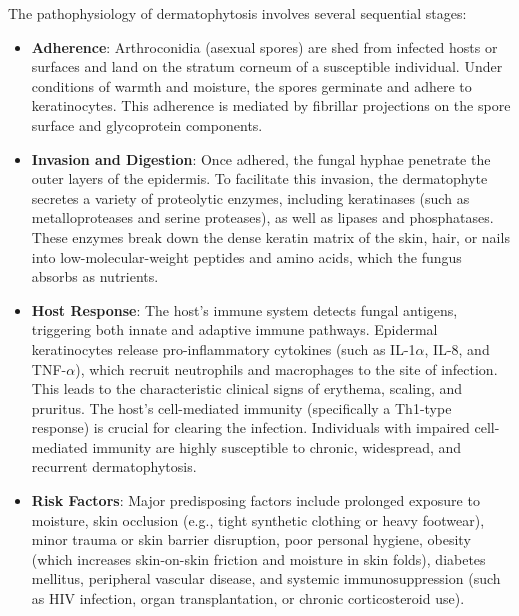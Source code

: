 The pathophysiology of dermatophytosis involves several sequential stages:
\begin{itemize}
    \item \textbf{Adherence}: Arthroconidia (asexual spores) are shed from infected hosts or surfaces and land on the stratum corneum of a susceptible individual. Under conditions of warmth and moisture, the spores germinate and adhere to keratinocytes. This adherence is mediated by fibrillar projections on the spore surface and glycoprotein components.
    \item \textbf{Invasion and Digestion}: Once adhered, the fungal hyphae penetrate the outer layers of the epidermis. To facilitate this invasion, the dermatophyte secretes a variety of proteolytic enzymes, including keratinases (such as metalloproteases and serine proteases), as well as lipases and phosphatases. These enzymes break down the dense keratin matrix of the skin, hair, or nails into low-molecular-weight peptides and amino acids, which the fungus absorbs as nutrients.
    \item \textbf{Host Response}: The host's immune system detects fungal antigens, triggering both innate and adaptive immune pathways. Epidermal keratinocytes release pro-inflammatory cytokines (such as IL-1$\alpha$, IL-8, and TNF-$\alpha$), which recruit neutrophils and macrophages to the site of infection. This leads to the characteristic clinical signs of erythema, scaling, and pruritus. The host's cell-mediated immunity (specifically a Th1-type response) is crucial for clearing the infection. Individuals with impaired cell-mediated immunity are highly susceptible to chronic, widespread, and recurrent dermatophytosis.
    \item \textbf{Risk Factors}: Major predisposing factors include prolonged exposure to moisture, skin occlusion (e.g., tight synthetic clothing or heavy footwear), minor trauma or skin barrier disruption, poor personal hygiene, obesity (which increases skin-on-skin friction and moisture in skin folds), diabetes mellitus, peripheral vascular disease, and systemic immunosuppression (such as HIV infection, organ transplantation, or chronic corticosteroid use).
\end{itemize}

